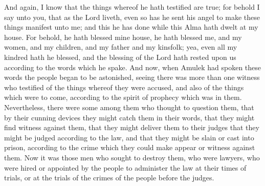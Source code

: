 And again, I know that the things whereof he hath testified are true; for behold I say unto you, that as the Lord liveth, even so has he sent his angel to make these things manifest unto me; and this he has done while this Alma hath dwelt at my house.
\bverse \iffalse For behold, he hath blessed mine house, he hath blessed me, and my women, and my children, and my father and my kinsfolk; yea, even all my kindred hath he blessed, and the blessing of the Lord hath rested upon us according to the words which he spake. \fi
For behold, he hath blessed mine house, he hath blessed me, and my women, and my children, and my father and my kinsfolk; yea, even all my kindred hath he blessed, and the blessing of the Lord hath rested upon us according to the words which he spake.
\bverse \iffalse And now, when Amulek had spoken these words the people began to be astonished, seeing there was more than one witness who testified of the things whereof they were accused, and also of the things which were to come, according to the spirit of prophecy which was in them. \fi
And now, when Amulek had spoken these words the people began to be astonished, seeing there was more than one witness who testified of the things whereof they were accused, and also of the things which were to come, according to the spirit of prophecy which was in them.
\bverse \iffalse Nevertheless, there were some among them who thought to question them, that by their cunning devices they might catch them in their words, that they might find witness against them, that they might deliver them to their judges that they might be judged according to the law, and that they might be slain or cast into prison, according to the crime which they could make appear or witness against them. \fi
Nevertheless, there were some among them who thought to question them, that by their cunning devices they might catch them in their words, that they might find witness against them, that they might deliver them to their judges that they might be judged according to the law, and that they might be slain or cast into prison, according to the crime which they could make appear or witness against them.
\bverse \iffalse Now it was those men who sought to destroy them, who were lawyers, who were hired or appointed by the people to administer the law at their times of trials, or at the trials of the crimes of the people before the judges. \fi
Now it was those men who sought to destroy them, who were lawyers, who were hired or appointed by the people to administer the law at their times of trials, or at the trials of the crimes of the people before the judges.
